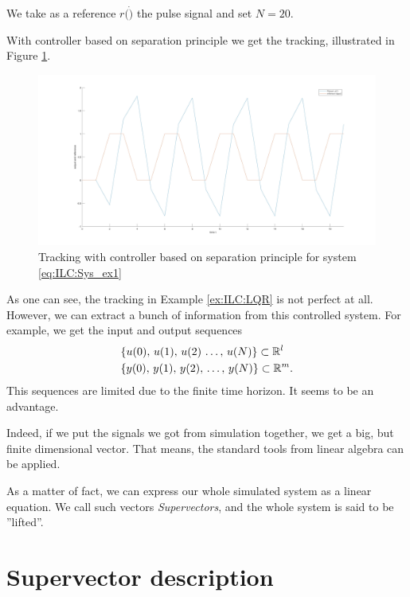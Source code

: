 \begin{example}
We take as a reference $r(\dot)$ the pulse signal and set $N = 20$. 

With controller based on separation principle we get the tracking, illustrated in  Figure \ref{img:ILC:LQR_control}.
\begin{figure}[ht]
	\centering
	\includegraphics[width=\textwidth]{fig/LQR_ex.jpg}
	\caption{Tracking with controller based on separation principle for system \eqref{eq:ILC:Sys_ex1}}
	\label{img:ILC:LQR_control}
\end{figure}
\end{example}



As one can see, the tracking in Example \ref{ex:ILC:LQR} is not perfect at all. However, we can extract a bunch of information from this controlled system. For example, we get the input and output sequences 
\begin{align}
&\{u(0), \, u(1), \,  u(2) \, \dots , \, u(N)\} \subset {\mathbb{R}}^l \label{eq:ILC:u_seq} \\
&\{y(0), \, y(1), \, y(2) , \, \dots , \, y(N)\}\subset {\mathbb{R}}^m.\label{eq:ILC:y_seq}
\end{align}
This sequences are limited due to the finite time horizon. It seems to be an advantage. 

Indeed, if we put the signals we got from simulation together, we get a big, but finite dimensional vector. That means, the standard tools from linear algebra can be applied. 

As a matter of fact, we can express our whole simulated system as a linear equation. We call such vectors \textit{Supervectors}, and the whole system is said to be ''lifted''.

\section{Supervector description} 

